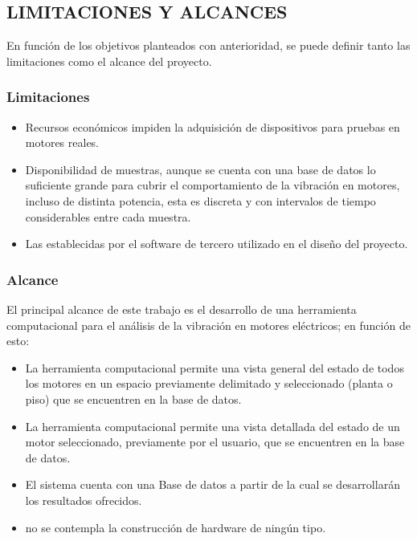 
\subsection{LIMITACIONES Y ALCANCES}
    En función de los objetivos planteados con anterioridad, se puede definir
    tanto las limitaciones como el alcance del proyecto.

\subsubsection{Limitaciones}
\begin{itemize}
    \item Recursos económicos impiden la adquisición de dispositivos para
        pruebas en motores reales.

    \item Disponibilidad de muestras, aunque se cuenta con una base de datos lo
        suficiente grande para cubrir el comportamiento de la vibración en
        motores, incluso de distinta potencia, esta es discreta y con
        intervalos de tiempo considerables entre cada muestra.


    \item Las establecidas por el software de tercero utilizado en el diseño
        del proyecto.
\end{itemize}

\subsubsection{Alcance}
    El principal alcance de este trabajo es el desarrollo de una herramienta
    computacional para el análisis de la vibración en motores eléctricos; en
    función de esto:

	\begin{itemize}
        \item La herramienta computacional permite una vista general del estado
            de todos los motores en un espacio previamente delimitado y
            seleccionado (planta o piso) que se encuentren en la base de datos.

        \item La herramienta computacional permite una vista detallada del
            estado de un motor seleccionado, previamente por el usuario, que se
            encuentren en la base de datos.

        \item El sistema cuenta con una Base de datos a partir de la cual se
            desarrollarán los resultados ofrecidos.

        \item no se contempla la construcción de hardware de ningún tipo.


	\end{itemize}
